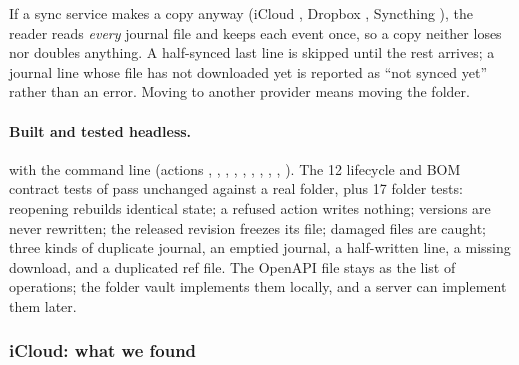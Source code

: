 If a sync service makes a copy anyway (iCloud , Dropbox ,
Syncthing ), the reader reads \emph{every} journal file and keeps each event once, so a
copy neither loses nor doubles anything. A half-synced last line is skipped until the rest arrives; a journal line
whose file has not downloaded yet is reported as ``not synced yet'' rather than an error. Moving to another
provider means moving the folder.

\paragraph{Built and tested headless.}  with the command line
 (actions , , , , ,
, , , , ). The 12 lifecycle
and BOM contract tests of  pass unchanged against a real folder, plus 17 folder tests: reopening rebuilds
identical state; a refused action writes nothing; versions are never rewritten; the released revision freezes its
file; damaged files are caught; three kinds of duplicate journal, an emptied journal, a half-written line, a missing
download, and a duplicated ref file. The OpenAPI file stays as the list of operations; the folder vault
implements them locally, and a server can implement them later.

\subsubsection*{iCloud: what we found}

